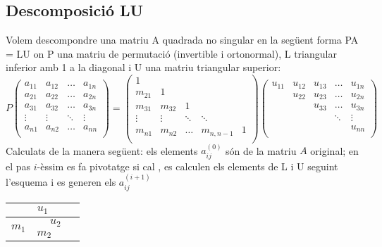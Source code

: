 \documentclass[a4paper,10pt]{article}
\begin{document}
\subsection{Descomposició LU}
Volem descompondre una matriu A quadrada no singular en la següent forma PA = LU on P una matriu de permutació (invertible i ortonormal),
L triangular inferior amb 1 a la diagonal i U una matriu triangular superior:
\[
  P
  \left(
  \begin{array}{cccc}
  a_{11}	&	a_{12}	&	\ldots	&	a_{1n}	\\
  a_{21}	&	a_{22}	&	\ldots	&	a_{2n}	\\
  a_{31}	&	a_{32}	&	\ldots	&	a_{3n}	\\
  \vdots	&	\vdots	& 	\ddots	&	\vdots	\\
  a_{n1}	&	a_{n2}	&	\ldots	&	a_{nn}	\\
  \end{array}
  \right)
  =
  \left(
  \begin{array}{ccccc}
  1			&			&		&		&		\\	
  m_{21}	&	1		&		&		&		\\
  m_{31}	&	m_{32}	&	1	&		&		\\
  \vdots	&	\vdots	&\ddots	&\ddots	& 		\\
  m_{n1}	&	m_{n2}	&\ldots	&	m_{n,n-1}&	1	\\
  \end{array}
  \right)
  \left(
  \begin{array}{ccccc}
  u_{11}&u_{12}	& u_{13}&	\ldots	&	u_{1n}	\\	
  		&u_{22}	& u_{23}&	\ldots	&	u_{2n}	\\
  		&		& u_{33}&	\ldots	&	u_{3n}	\\
  		&		& 		&	\ddots	&	\vdots	\\
  		&		&		&			&	u_{nn}	\\
  \end{array}
  \right)
\]
Calculats de la manera següent: els elements $a_{ij}^{(0)}$ són de la matriu $A$ original; en el pas $i$-èssim es fa pivotatge si cal
, es calculen els elements de L i U seguint l'esquema i es generen els $a_{ij}^{(i+1)}$ \\
\begin{minipage}{0.2\textwidth}
 \begin{tabular}{|c|c|cc|}
\hline
\multicolumn{4}{|c|}{$u_1$} \\ \hline
\multirow{3}{*}{$m_1$} & \multicolumn{3}{|c|}{$u_2$} \\ \cline{2-4}
				   & \multirow{2}{*}{$m_2$} &  &  \\
				   &					& &  \\
\hline
\end{tabular}
\end{minipage}
\end{document}
